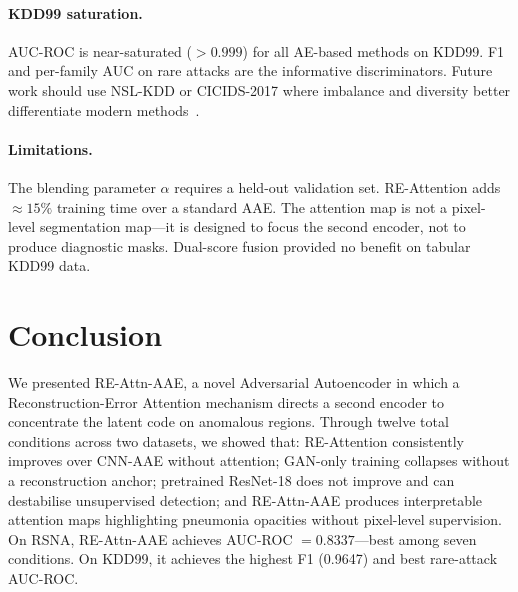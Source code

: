 \documentclass[11pt,a4paper]{article}
\newcommand{\method}{RE-Attn-AAE}
\begin{document}
\paragraph{KDD99 saturation.}
AUC-ROC is near-saturated ($>0.999$) for all AE-based methods on KDD99.
F1 and per-family AUC on rare attacks are the informative discriminators.
Future work should use NSL-KDD or CICIDS-2017 where imbalance and diversity
better differentiate modern methods~\cite{improving_ae_nslkdd_2021}.

\paragraph{Limitations.}
The blending parameter $\alpha$ requires a held-out validation set.
RE-Attention adds $\approx15\%$ training time over a standard AAE.
The attention map is not a pixel-level segmentation map—it is designed to
focus the second encoder, not to produce diagnostic masks.
Dual-score fusion provided no benefit on tabular KDD99 data.

\section{Conclusion}

We presented \method{}, a novel Adversarial Autoencoder in which a
Reconstruction-Error Attention mechanism directs a second encoder to concentrate
the latent code on anomalous regions.
Through twelve total conditions across two datasets, we showed that:
RE-Attention consistently improves over CNN-AAE without attention;
GAN-only training collapses without a reconstruction anchor;
pretrained ResNet-18 does not improve and can destabilise unsupervised detection;
and \method{} produces interpretable attention maps highlighting pneumonia opacities
without pixel-level supervision.
On RSNA, \method{} achieves AUC-ROC $=0.8337$—best among seven conditions.
On KDD99, it achieves the highest F1 (0.9647) and best rare-attack AUC-ROC.



\end{document}
